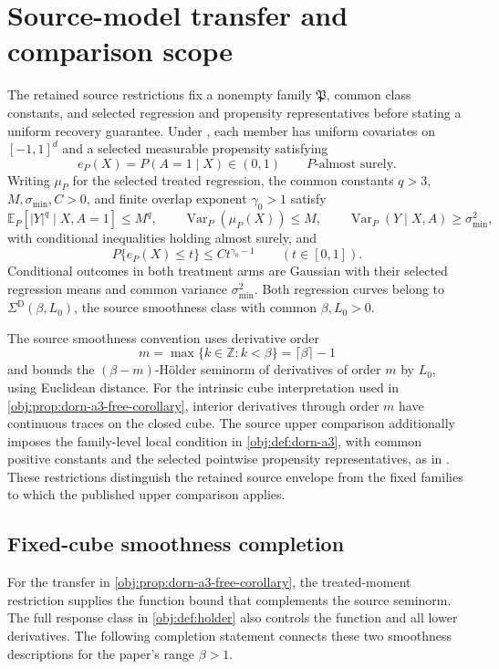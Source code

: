 \section{Source-model transfer and comparison scope}

The retained source restrictions fix a nonempty family \(\mathfrak P\), common class constants, and selected regression and propensity representatives before stating a uniform recovery guarantee. Under \citet[Section 2, Assumptions 1--2, author PDF pp.~3--7]{Dorn2026GlobalOverlap}, each member has uniform covariates on \([-1,1]^d\) and a selected measurable propensity satisfying
\[
e_P(X)=P(A=1\mid X)\in(0,1)
\qquad P\text{-almost surely}.
\]
Writing \(\mu_P\) for the selected treated regression, the common constants \(q>3\), \(M,\sigma_{\min},C>0\), and finite overlap exponent \(\gamma_0>1\) satisfy
\[
\mathbb E_P\!\left[|Y|^q\mid X,A=1\right]\le M^q,
\qquad
\operatorname{Var}_P(\mu_P(X))\le M,
\qquad
\operatorname{Var}_P(Y\mid X,A)\ge\sigma_{\min}^2,
\]
with conditional inequalities holding almost surely, and
\[
P\{e_P(X)\le t\}\le Ct^{\gamma_0-1}
\qquad(t\in[0,1]).
\]
Conditional outcomes in both treatment arms are Gaussian with their selected regression means and common variance \(\sigma_{\min}^2\). Both regression curves belong to \(\Sigma^{\mathrm D}(\beta,L_0)\), the source smoothness class with common \(\beta,L_0>0\).

The source smoothness convention uses derivative order
\[
m=\max\{k\in\mathbb Z:k<\beta\}=\lceil\beta\rceil-1
\]
and bounds the \((\beta-m)\)-Hölder seminorm of derivatives of order \(m\) by \(L_0\), using Euclidean distance. For the intrinsic cube interpretation used in \cref{obj:prop:dorn-a3-free-corollary}, interior derivatives through order \(m\) have continuous traces on the closed cube. The source upper comparison additionally imposes the family-level local condition in \cref{obj:def:dorn-a3}, with common positive constants and the selected pointwise propensity representatives, as in \citet[Section 2, Assumption 3, author PDF pp.~6--7]{Dorn2026GlobalOverlap}. These restrictions distinguish the retained source envelope from the fixed families to which the published upper comparison applies.

\subsection{Fixed-cube smoothness completion}

For the transfer in \cref{obj:prop:dorn-a3-free-corollary}, the treated-moment restriction supplies the function bound that complements the source seminorm. The full response class in \cref{obj:def:holder} also controls the function and all lower derivatives. The following completion statement connects these two smoothness descriptions for the paper's range \(\beta>1\).


